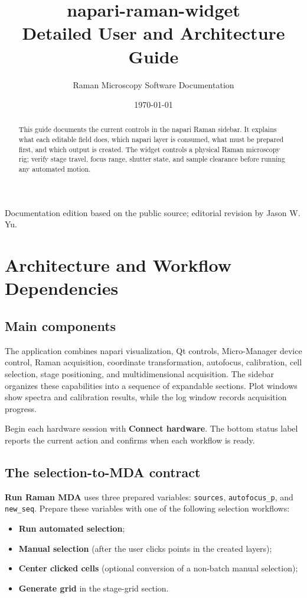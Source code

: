\documentclass[11pt,oneside]{report}
\title{\textbf{napari-raman-widget}\\\Large Detailed User and Architecture Guide}
\author{Raman Microscopy Software Documentation}
\date{\today}
\newcommand{\ui}[1]{\textbf{#1}}
\newcommand{\code}[1]{\texttt{#1}}
\begin{document}
\maketitle
\thispagestyle{empty}
\begin{abstract}
This guide documents the current controls in the napari Raman sidebar. It explains what each editable field does,
which napari layer is consumed, what must be prepared first, and which output is
created. The widget controls a physical Raman microscopy rig; verify stage travel,
focus range, shutter state, and sample clearance before running any automated motion.
\end{abstract}
\vfill
{\footnotesize Documentation edition based on the public source; editorial revision by Jason W. Yu.}
\clearpage
\tableofcontents

\chapter{Architecture and Workflow Dependencies}

\section{Main components}
The application combines napari visualization, Qt controls, Micro-Manager device
control, Raman acquisition, coordinate transformation, autofocus, calibration,
cell selection, stage positioning, and multidimensional acquisition. The sidebar
organizes these capabilities into a sequence of expandable sections. Plot windows
show spectra and calibration results, while the log window records acquisition progress.

Begin each hardware session with \ui{Connect hardware}. The bottom status label
reports the current action and confirms when each workflow is ready.

\section{The selection-to-MDA contract}
\ui{Run Raman MDA} uses three prepared variables: \code{sources},
\code{autofocus\_p}, and \code{new\_seq}. Prepare these variables with one of the
following selection workflows:
\begin{itemize}
  \item \ui{Run automated selection};
  \item \ui{Manual selection} (after the user clicks points in the created layers);
  \item \ui{Center clicked cells} (optional conversion of a non-batch manual selection);
  \item \ui{Generate grid} in the stage-grid section.
\end{itemize}
\end{document}
